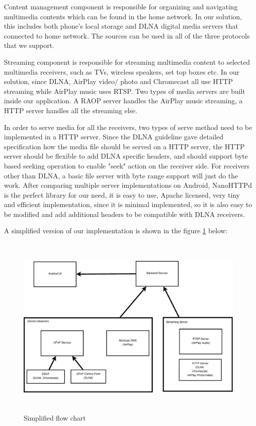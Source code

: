 Content management component is responsible for organizing and
navigating multimedia contents which can be found in the home network. In our
solution, this includes both phone's local storage and DLNA digital media
servers that connected to home network. The sources can be used in all of the
three protocols that we support.

Streaming component is responsible for streaming multimedia content to selected
multimedia receivers, such as TVs, wireless speakers, set top boxes etc. In our
solution, since DLNA, AirPlay video/ photo and Chromecast all use HTTP streaming
while AirPlay music uses RTSP. Two types of media servers are built inside our
application. A RAOP server handles the AirPlay music streaming, a HTTP server
handles all the streaming else.

In order to serve media for all the receivers, two types of serve method need to
be implemented in a HTTP server. Since the DLNA guideline gave detailed
specification how the media file should be served on a HTTP server, the HTTP server should be
flexible to add DLNA specific headers, and should support byte based seeking
operation to enable "seek" action on the receiver side. For receivers other than
DLNA, a basic file server with byte range support will just do the work. After
comparing multiple server implementations on Android, NanoHTTPd is the perfect
library for our need, it is easy to use, Apache licensed, very tiny and
efficient implementation, since it is minimal implemented, so it is also easy to
be modified and add additional headers to be compatible with DLNA receivers.


A simplified version of our implementation is shown in the figure \ref{chart3}
below:
\begin{figure}[htb]
\centering \includegraphics[height=9cm]{charts/chart3}
\caption{Simplified flow chart \label{chart3}}
\end{figure}

